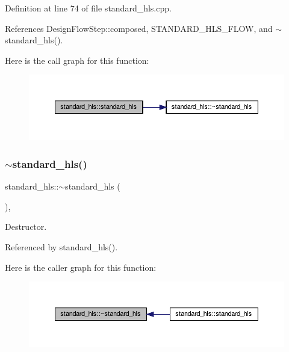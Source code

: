 Definition at line 74 of file standard\+\_\+hls.\+cpp.



References Design\+Flow\+Step\+::composed, S\+T\+A\+N\+D\+A\+R\+D\+\_\+\+H\+L\+S\+\_\+\+F\+L\+OW, and $\sim$standard\+\_\+hls().

Here is the call graph for this function\+:
\nopagebreak
\begin{figure}[H]
\begin{center}
\leavevmode
\includegraphics[width=350pt]{db/d96/classstandard__hls_aaf82a542e4a533eda425fbc186971954_cgraph}
\end{center}
\end{figure}
\mbox{\label{classstandard__hls_a7a265edcf53d0a76600cf3f079eba1da}} 
\subsubsection{\texorpdfstring{$\sim$standard\+\_\+hls()}{~standard\_hls()}}
{\footnotesize\ttfamily standard\+\_\+hls\+::$\sim$standard\+\_\+hls (\begin{DoxyParamCaption}{ }\end{DoxyParamCaption})\hspace{0.3cm}{\ttfamily [override]}, {\ttfamily [default]}}



Destructor. 



Referenced by standard\+\_\+hls().

Here is the caller graph for this function\+:
\nopagebreak
\begin{figure}[H]
\begin{center}
\leavevmode
\includegraphics[width=350pt]{db/d96/classstandard__hls_a7a265edcf53d0a76600cf3f079eba1da_icgraph}
\end{center}
\end{figure}


